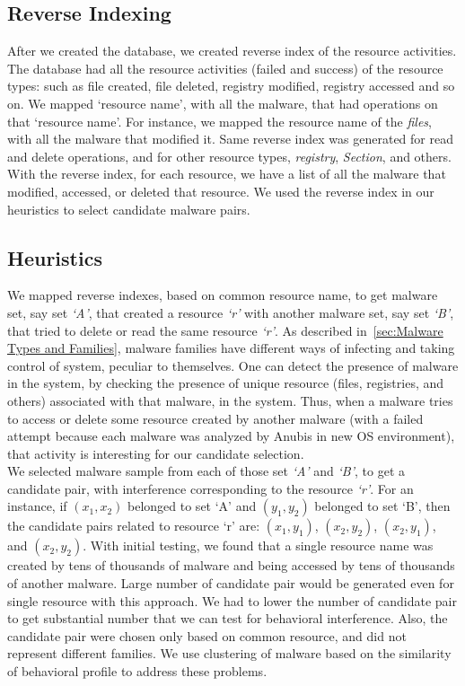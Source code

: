 \subsection{Reverse Indexing}
\label{sub:Reverse Indexing}
After we created the database, we created reverse index of the resource activities.
The database had all the resource activities (failed and success) of the resource types: such as file created, file deleted, registry modified, registry accessed and so on.
We mapped `resource name', with all the malware, that had operations on that `resource name'.
For instance, we mapped the resource name of the \emph{files}, with all the malware that modified it.
Same reverse index was generated for read and delete operations, and for other resource types, \emph{registry}, \emph{Section}, and others.
With the reverse index, for each resource, we have a list of all the malware that modified, accessed, or deleted that resource.
We used the reverse index in our heuristics to select candidate malware pairs.
\subsection{Heuristics}
\label{sub:Heuristics}
We mapped reverse indexes, based on common resource name, to get malware set, say set \emph{`A'}, that created a resource \emph{`r'} with another malware set, say set \emph{`B'}, that tried to delete or read the same resource \emph{`r'}.
As described in~\autoref{sec:Malware Types and Families}, malware families have different ways of infecting and taking control of system, peculiar to themselves.
One can detect the presence of malware in the system, by checking the presence of unique resource (files, registries, and others) associated with that malware, in the system.
Thus, when a malware tries to access or delete some resource created by another malware (with a failed attempt because each malware was analyzed by Anubis in new OS environment), that activity is interesting for our candidate selection.\\

We selected malware sample from each of those set \emph{`A'} and \emph{`B'}, to get a candidate pair, with interference corresponding to the resource \emph{`r'}.
For an instance, if $(x_1,x_2)$ belonged to set `A' and $(y_1,y_2)$ belonged to set `B', then the candidate pairs related to resource `r' are: $(x_1,y_1)$, $(x_2,y_2)$, $(x_2,y_1)$, and $(x_2,y_2)$.
With initial testing, we found that a single resource name was created by tens of thousands of malware and being accessed by tens of thousands of another malware.
Large number of candidate pair would be generated even for single resource with this approach.
We had to lower the number of candidate pair to get substantial number that we can test for behavioral interference.
Also, the candidate pair were chosen only based on common resource, and did not represent different families.
We use clustering of malware based on the similarity of behavioral profile to address these problems.
